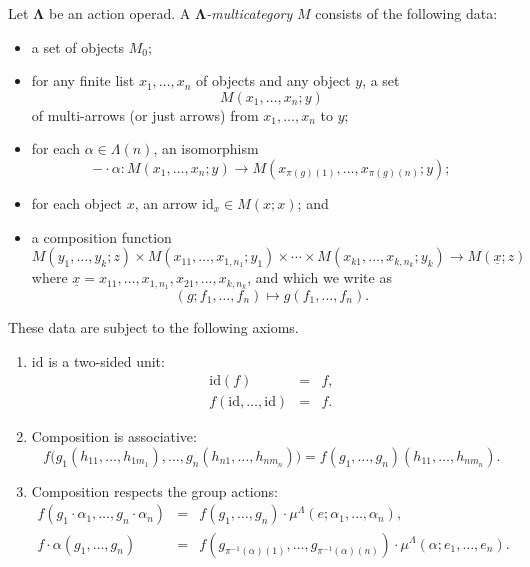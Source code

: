 \documentclass{amsbook} %
\newcommand{\mb}{\mathbf}
\newcommand{\id}{\textrm{id}}
\numberwithin{section}{chapter}
\begin{document}
\begin{Defi}\label{lambda_multicat}
Let $\mb{\Lambda}$ be an action operad.  A \emph{$\mb{\Lambda}$-multicategory} $M$ consists of the following data:
\begin{itemize}
\item a set of objects $M_{0}$;
\item for any finite list $x_{1}, \ldots, x_{n}$ of objects and any object $y$, a set
\[
M(x_{1}, \ldots, x_{n}; y)
\]
of multi-arrows (or just arrows) from $x_{1}, \ldots, x_{n}$ to $y$;
\item for each $\alpha \in \Lambda(n)$, an isomorphism
\[
-\cdot \alpha : M(x_{1}, \ldots, x_{n}; y) \rightarrow M(x_{\pi(g)(1)}, \ldots, x_{\pi(g)(n)}; y);
\]
\item for each object $x$, an arrow $\id_{x} \in M(x;x)$; and
\item a composition function
\[
M(y_{1}, \ldots, y_{k}; z) \times M(x_{11}, \ldots, x_{1,n_{1}}; y_{1}) \times \cdots \times M(x_{k1}, \ldots, x_{k,n_{k}}; y_{k}) \rightarrow M(\underline{x}; z)
\]
where $\underline{x} = x_{11}, \ldots, x_{1,n_{1}}, x_{21}, \ldots, x_{k,n_{k}}$, and which we write as
\[
(g; f_{1}, \ldots, f_{n}) \mapsto g(f_{1}, \ldots, f_{n}).
\]
\end{itemize}
These data are subject to the following axioms.
\begin{enumerate}
\item $\id$ is a two-sided unit:
\[
\begin{array}{rcl}
\id (f) & = & f, \\
f(\id, \ldots, \id) & = & f.
\end{array}
\]
\item Composition is associative:
\[
f\Big( g_{1}(h_{11}, \ldots, h_{1m_{1}}), \ldots, g_{n}(h_{n1}, \ldots, h_{nm_{n}}) \Big) = f(g_{1}, \ldots, g_{n})(h_{11}, \ldots, h_{nm_{n}}).
\]
\item Composition respects the group actions:
\[
\begin{array}{rcl}
f(g_{1} \cdot \alpha_{1}, \ldots, g_{n} \cdot \alpha_{n}) & = & f(g_{1}, \ldots, g_{n}) \cdot \mu^{\Lambda}(e; \alpha_{1}, \ldots, \alpha_{n}), \\
f\cdot \alpha (g_{1}, \ldots, g_{n}) & = & f(g_{\pi^{-1}(\alpha)(1)}, \ldots, g_{\pi^{-1}(\alpha)(n)}) \cdot \mu^{\Lambda}(\alpha; e_{1}, \ldots, e_{n}).
\end{array}
\]
\end{enumerate}
\end{Defi}
\end{document}
